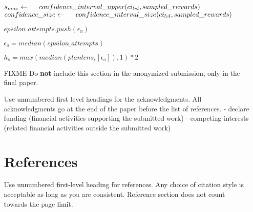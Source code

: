 \documentclass{article}
\begin{document}
\begin{algorithm}[h]
{{                
                $s_{max}           \gets
                \hspace{0.5cm}    confidence\_interval\_upper(ci_{lvl}, sampled\_rewards)$
                $confidence\_size \gets
                \hspace{0.5cm}    confidence\_interval\_size(ci_{lvl} , sampled\_rewards)$
            }
            
            
            $epsilon\_attempts.push(\epsilon_n)$
        }
        $\epsilon_o = median(epsilon\_attempts)$

        $h_o = max(median(planlens_\epsilon[\epsilon_o]), 1) * 2$

    \end{algorithm}




    \begin{ack}
        FIXME
        Do {\bf not} include this section in the anonymized submission, only in the final paper.
        
        Use unnumbered first level headings for the acknowledgments.
        All acknowledgments go at the end of the paper before the list of references.
        - declare funding (financial activities supporting the submitted work)
        - competing interests (related financial activities outside the submitted work)
    \end{ack}


    \section*{References}
        Use unnumbered first-level heading for references.
        Any choice of citation style is acceptable as long as you are consistent.
        Reference section does not count towards the page limit.
    \medskip
\end{document}
